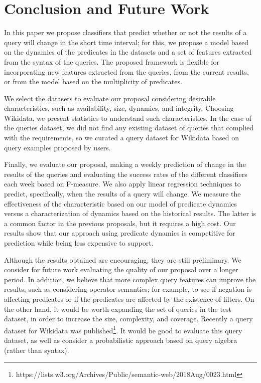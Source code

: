 \documentclass[runningheads]{llncs}
\begin{document}
\section{Conclusion and Future Work}
\label{sec:conclusion}

In this paper we propose classifiers that predict whether or not the results of a query will change in the short time interval; for this, we propose a model based on the dynamics of the predicates in the datasets and a set of features extracted from the syntax of the queries. The proposed framework is flexible for incorporating new features extracted from the queries, from the current results, or from the model based on the multiplicity of predicates.

We select the datasets to evaluate our proposal considering desirable characteristics, such as availability, size, dynamics, and integrity. Choosing Wikidata, we present statistics to understand such characteristics. In the case of the queries dataset, we did not find any existing dataset of queries that complied with the requirements, so we curated a query dataset for Wikidata based on query examples proposed by users.

Finally, we evaluate our proposal, making a weekly prediction of change in the results of the queries and evaluating the success rates of the different classifiers each week based on F-measure. We also apply linear regression techniques to predict, specifically, when the results of a query will change.
We measure the effectiveness of the characteristic based on our model of predicate dynamics versus a characterization of dynamics based on the historical results. The latter is a common factor in the previous proposals, but it requires a high cost. Our results show that our approach using predicate dynamics is competitive for prediction while being less expensive to support.    

Although the results obtained are encouraging, they are still preliminary. We consider for future work evaluating the quality of our proposal over a longer period. In addition, we believe that more complex query features can improve the results, such as considering operator semantics; for example, to see if negation is affecting predicates or if the predicates are affected by the existence of filters. On the other hand, it would be worth expanding the set of queries in the test dataset, in order to increase the size, complexity, and coverage. Recently a query dataset for Wikidata was published\footnote{https://lists.w3.org/Archives/Public/semantic-web/2018Aug/0023.html}. It would be good to evaluate this query dataset, as well as consider a probabilistic approach based on query algebra (rather than syntax).




\end{document}
